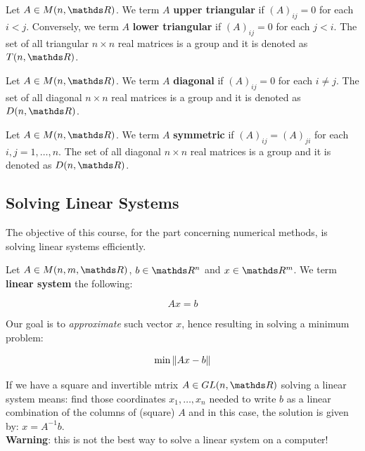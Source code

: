 \documentclass[computationalMathematics.tex]{subfiles}
\begin{document}
\begin{definition}
  Let $A \in M(n, \R)$. We term $A$ \textbf{upper triangular} if ${(A)}_{ij} =0$ for each $i<j$.
  Conversely, we term $A$ \textbf{lower triangular} if ${(A)}_{ij} =0$ for each $j<i$.
  The set of all triangular $n \times n$ real matrices is a group and it is denoted as $T(n, \R)$.
\end{definition}

\begin{definition}
  Let $A \in M(n, \R)$. We term $A$ \textbf{diagonal} if ${(A)}_{ij} = 0$ for each $i \neq j$.
  The set of all diagonal $n \times n$ real matrices is a group and it is denoted as $D(n, \R)$.
\end{definition}

\begin{definition}
  Let $A \in M(n, \R)$. We term $A$ \textbf{symmetric} if ${(A)}_{ij} = {(A)}_{ji}$ for each $i,j = 1, \ldots, n$.
  The set of all diagonal $n \times n$ real matrices is a group and it is denoted as $D(n, \R)$.

\end{definition}

\subsection{Solving Linear Systems}
The objective of this course, for the part concerning numerical methods, is solving linear systems efficiently.

\begin{definition}
  Let $A \in M(n, m, \R)$, $b \in \R^n$ and $x \in \R^m$. We term \textbf{linear system} the following:

  \[
Ax = b
  \]
\end{definition}

\noindent Our goal is to \emph{approximate} such vector $x$, hence resulting in solving a minimum problem:

\[
  \min\limits \left\lVert Ax - b\right\rVert
\]

If we have a square and invertible mtrix $A \in GL(n, \R)$ solving a linear system means: find those coordinates $x_1, \dots , x_n$ needed to write $b$ as a linear combination of the columns of (square) $A$ and in this case, the solution is given by: $x = A^{-1}b$. \\
\textbf{Warning}: this is not the best way to solve a linear system on a computer!\\
\end{document}
